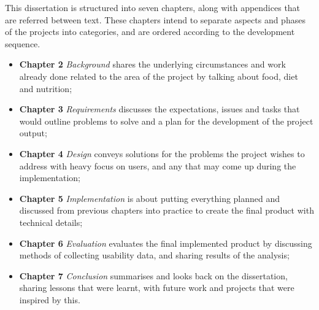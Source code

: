 \documentclass[../main.tex]{subfiles}
\begin{document}
This dissertation is structured into seven chapters, along with appendices that are referred between text. These chapters intend to separate aspects and phases of the projects into categories, and are ordered according to the development sequence.

\begin{itemize}
    \setlength\itemsep{0.6em}
    \item \textbf{Chapter 2} \textit{Background} shares the underlying circumstances and work already done related to the area of the project by talking about food, diet and nutrition;
    \item \textbf{Chapter 3} \textit{Requirements} discusses the expectations, issues and tasks that would outline problems to solve and a plan for the development of the project output;
    \item \textbf{Chapter 4} \textit{Design} conveys solutions for the problems the project wishes to address with heavy focus on users, and any that may come up during the implementation;
    \item \textbf{Chapter 5} \textit{Implementation} is about putting everything planned and discussed from previous chapters into practice to create the final product with technical details;
    \item \textbf{Chapter 6} \textit{Evaluation} evaluates the final implemented product by discussing methods of collecting usability data, and sharing results of the analysis;
    \item \textbf{Chapter 7} \textit{Conclusion} summarises and looks back on the dissertation, sharing lessons that were learnt, with future work and projects that were inspired by this.
\end{itemize}
\end{document}
